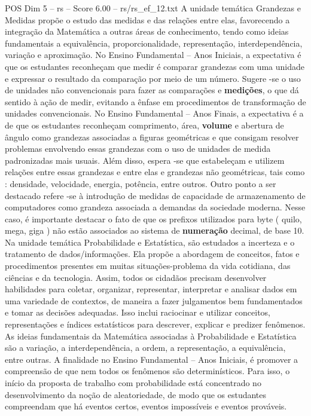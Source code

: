 \begin{textsample}{POS Dim 5 – rs – Score 6.00 – rs/rs\_ef\_12.txt}  \label{ex:f5_pos_264}
A unidade temática Grandezas e Medidas propõe o estudo das medidas e das relações entre elas, favorecendo a integração da Matemática a outras áreas de conhecimento, tendo como ideias fundamentais a equivalência, proporcionalidade, representação, interdependência, variação e aproximação.
No Ensino Fundamental – Anos Iniciais, a expectativa é que os estudantes reconheçam que medir é comparar grandezas com uma unidade e expressar o resultado da comparação por meio de um número.
Sugere -se o uso de unidades não convencionais para fazer as comparações e \textbf{medições}, o que dá sentido à ação de medir, evitando a ênfase em procedimentos de transformação de unidades convencionais.
No Ensino Fundamental – Anos Finais, a expectativa é a de que os estudantes reconheçam comprimento, área, \textbf{volume} e abertura de ângulo como grandezas associadas a figuras geométricas e que consigam resolver problemas envolvendo essas grandezas com o uso de unidades de medida padronizadas mais usuais.
Além disso, espera -se que estabeleçam e utilizem relações entre essas grandezas e entre elas e grandezas não geométricas, tais como : densidade, velocidade, energia, potência, entre outros.
Outro ponto a ser destacado refere -se à introdução de medidas de capacidade de armazenamento de computadores como grandeza associada a demandas da sociedade moderna.
Nesse caso, é importante destacar o fato de que os prefixos utilizados para byte ( quilo, mega, giga ) não estão associados ao sistema de \textbf{numeração} decimal, de base 10.
Na unidade temática Probabilidade e Estatística, são estudados a incerteza e o tratamento de dados/informações.
Ela propõe a abordagem de conceitos, fatos e procedimentos presentes em muitas situações-problema da vida cotidiana, das ciências e da tecnologia.
Assim, todos os cidadãos precisam desenvolver habilidades para coletar, organizar, representar, interpretar e analisar dados em uma variedade de contextos, de maneira a fazer julgamentos bem fundamentados e tomar as decisões adequadas.
Isso inclui raciocinar e utilizar conceitos, representações e índices estatísticos para descrever, explicar e predizer fenômenos.
As ideias fundamentais da Matemática associadas à Probabilidade e Estatística são a variação, a interdependência, a ordem, a representação, a equivalência, entre outras.
A finalidade no Ensino Fundamental – Anos Iniciais, é promover a compreensão de que nem todos os fenômenos são determinísticos.
Para isso, o início da proposta de trabalho com probabilidade está concentrado no desenvolvimento da noção de aleatoriedade, de modo que os estudantes compreendam que há eventos certos, eventos impossíveis e eventos prováveis.

\end{textsample}
